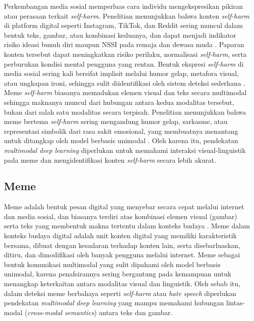 Perkembangan media sosial memperluas cara individu mengekspresikan pikiran atau perasaan terkait \textit{self-harm}. Penelitian menunjukkan bahwa konten \textit{self-harm} di platform digital seperti Instagram, TikTok, dan Reddit sering muncul dalam bentuk teks, gambar, atau kombinasi keduanya, dan dapat menjadi indikator risiko ideasi bunuh diri maupun NSSI pada remaja dan dewasa muda \cite{arendt2019effects}. Paparan konten tersebut dapat meningkatkan risiko perilaku, normalisasi \textit{self-harm}, serta perburukan kondisi mental pengguna yang rentan. Bentuk ekspresi \textit{self-harm} di media sosial sering kali bersifat implisit melalui humor gelap, metafora visual, atau ungkapan ironi, sehingga sulit diidentifikasi oleh sistem deteksi sederhana \cite{Sharma2022HarmfulMemes}.
Meme \textit{self-harm} biasanya memadukan elemen visual dan teks secara multimodal sehingga maknanya muncul dari hubungan antara kedua modalitas tersebut, bukan dari salah satu modalitas secara terpisah. Penelitian menunjukkan bahwa meme bertema \textit{self-harm} sering mengandung humor gelap, sarkasme, atau representasi simbolik dari rasa sakit emosional, yang membuatnya menantang untuk ditangkap oleh model berbasis unimodal \cite{kiela2020hateful}. Oleh karena itu, pendekatan \textit{multimodal deep learning} diperlukan untuk memahami interaksi visual-linguistik pada meme dan mengidentifikasi konten \textit{self-harm} secara lebih akurat.

\subsection{Meme} \label{II.teori9}
Meme adalah bentuk pesan digital yang menyebar secara cepat melalui internet dan media sosial, dan biasanya terdiri atas kombinasi elemen visual (gambar) serta teks yang membentuk makna tertentu dalam konteks budaya \cite{shifman2013memes}. Meme dalam konteks budaya digital adalah unit konten digital yang memiliki karakteristik bersama, dibuat dengan kesadaran terhadap konten lain, serta disebarluaskan, ditiru, dan dimodifikasi oleh banyak pengguna melalui internet.  Meme sebagai bentuk komunikasi multimodal yang sulit dipahami oleh model berbasis unimodal, karena penafsirannya sering bergantung pada kemampuan untuk menangkap keterkaitan antara modalitas visual dan linguistik. Oleh sebab itu, dalam deteksi meme berbahaya seperti \textit{self-harm} atau \textit{hate speech} diperlukan pendekatan \textit{multimodal deep learning} yang mampu memahami hubungan lintas-modal (\textit{cross-modal semantics}) antara teks dan gambar.


